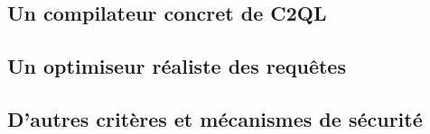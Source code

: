 
\subsection*{Un compilateur concret de C2QL}

\subsection*{Un optimiseur réaliste des requêtes}

\subsection*{D'autres critères et mécanismes de sécurité}